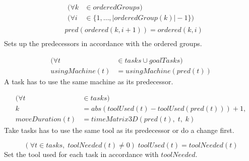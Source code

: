 \begin{equation}
 \begin{aligned}\label{eq:114}
 &\begin{aligned}
 (\forall k &\in orderedGroups) \\
 (\forall i &\in \{1 , \ldots , |orderedGroup(k)|-1\}) 
 \end{aligned}\\
 &pred(ordered(k, i + 1)) = ordered(k, i) \\
 \end{aligned}
 \end{equation}
 Sets up the predecessors in accordance with the ordered groups.
 
 \begin{equation}\label{eq:115}
 \begin{aligned}
 (\forall t &\in tasks \cup goalTasks) \\
 usingMachine(t) &= usingMachine(pred(t)) 
 \end{aligned}
 \end{equation}
 A task has to use the same machine as its predecessor.
 
 \begin{equation}\label{eq:116}
 \begin{aligned}
 (\forall t &\in tasks) \\
 k &= abs(toolUsed(t) - toolUsed(pred(t))) + 1, \\
 moveDuration(t) &= timeMatrix3D(pred(t), \; t, \; k)
 \end{aligned}
 \end{equation}
 Take tasks has to use the same tool as its predecessor or do a change first.
 
 \begin{equation}\label{eq:117}
 (\forall t \in tasks, \; toolNeeded(t) \neq 0) \; toolUsed(t) = toolNeeded(t)
 \end{equation}
 Set the tool used for each task in accordance with $toolNeeded$.
